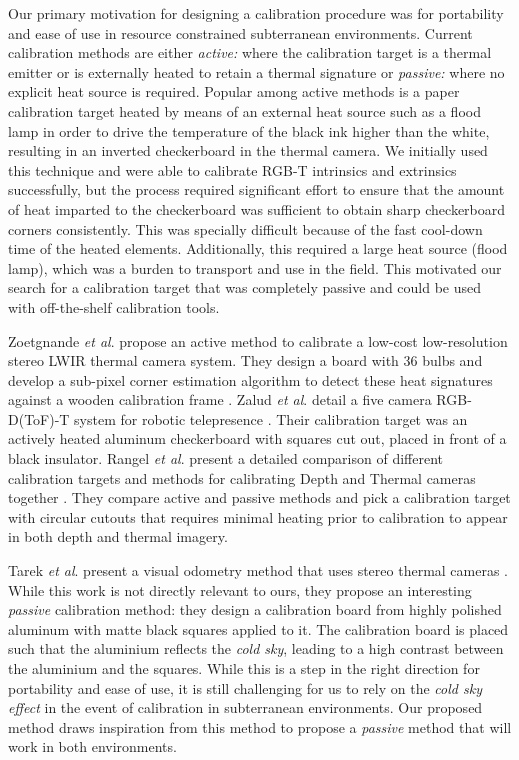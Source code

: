 \documentclass[letterpaper, 10 pt, conference]{ieeeconf}
\newcommand{\etal}{\textit{et al}. }
\begin{document}
Our primary motivation for designing a calibration procedure was for portability and ease of use in resource constrained subterranean environments. Current calibration methods are either \textit{active:} where the calibration target is a thermal emitter or is externally heated to retain a thermal signature or \textit{passive:} where no explicit heat source is required. Popular among active methods is a paper calibration target heated by means of an external heat source such as a flood lamp in order to drive the temperature of the black ink higher than the white, resulting in an inverted checkerboard in the thermal camera. We initially used this technique and were able to calibrate RGB-T intrinsics and extrinsics successfully, but the process required significant effort to ensure that the amount of heat imparted to the checkerboard was sufficient to obtain sharp checkerboard corners consistently. This was specially difficult because of the fast cool-down time of the heated elements\cite{vidas2012mask}. Additionally, this required a large heat source (flood lamp), which was a burden to transport and use in the field. This motivated our search for a calibration target that was completely passive and could be used with off-the-shelf calibration tools.

Zoetgnande \etal propose an active method to calibrate a low-cost low-resolution stereo LWIR thermal camera system. They design a board with 36 bulbs and develop a sub-pixel corner estimation algorithm to detect these heat signatures against a wooden calibration frame \cite{zoetgnande2019robust}. Zalud \etal detail a five camera RGB-D(ToF)-T system for robotic telepresence \cite{zalud2013fusion}. Their calibration target was an actively heated aluminum checkerboard with squares cut out, placed in front of a black insulator. Rangel \etal present a detailed comparison of different calibration targets and methods for calibrating Depth and Thermal cameras together \cite{rangel20143d}. They compare active and passive methods and pick a calibration target with circular cutouts that requires minimal heating prior to calibration to appear in both depth and thermal imagery. 

Tarek \etal present a visual odometry method that uses stereo thermal cameras \cite{mouats2015thermal}. While this work is not directly relevant to ours, they propose an interesting \textit{passive} calibration method: they design a calibration board from highly polished aluminum with matte black squares applied to it. The calibration board is placed such that the aluminium reflects the \textit{cold sky}, leading to a high contrast between the aluminium and the squares. While this is a step in the right direction for portability and ease of use, it is still challenging for us to rely on the \textit{cold sky effect} in the event of calibration in subterranean environments. Our proposed method draws inspiration from this method to propose a \textit{passive} method that will work in both environments.  
\end{document}
